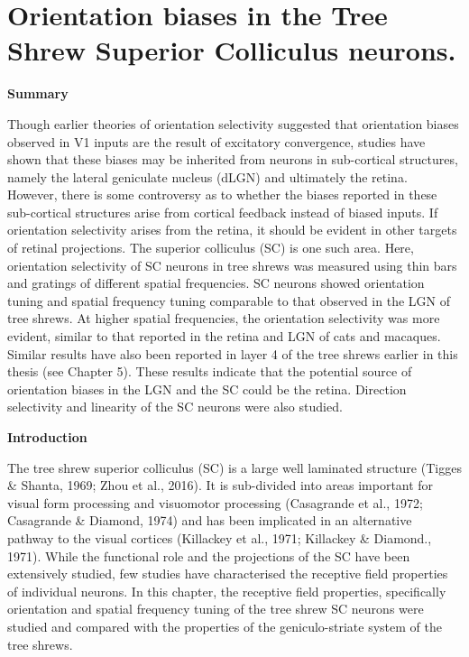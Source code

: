 \chapter{Orientation biases in the Tree Shrew Superior Colliculus
neurons.}

\textbf{Summary}

Though earlier theories of orientation selectivity suggested that
orientation biases observed in V1 inputs are the result of excitatory
convergence, studies have shown that these biases may be inherited from
neurons in sub-cortical structures, namely the lateral geniculate
nucleus (dLGN) and ultimately the retina. However, there is some
controversy as to whether the biases reported in these sub-cortical
structures arise from cortical feedback instead of biased inputs. If
orientation selectivity arises from the retina, it should be evident in
other targets of retinal projections. The superior colliculus (SC) is
one such area. Here, orientation selectivity of SC neurons in tree
shrews was measured using thin bars and gratings of different spatial
frequencies. SC neurons showed orientation tuning and spatial frequency
tuning comparable to that observed in the LGN of tree shrews. At higher
spatial frequencies, the orientation selectivity was more evident,
similar to that reported in the retina and LGN of cats and macaques.
Similar results have also been reported in layer 4 of the tree shrews
earlier in this thesis (see Chapter 5). These results indicate that the
potential source of orientation biases in the LGN and the SC could be
the retina. Direction selectivity and linearity of the SC neurons were
also studied.

\textbf{Introduction}

The tree shrew superior colliculus (SC) is a large well laminated
structure (Tigges \& Shanta, 1969; Zhou et al., 2016). It is sub-divided
into areas important for visual form processing and visuomotor
processing (Casagrande et al., 1972; Casagrande \& Diamond, 1974) and
has been implicated in an alternative pathway to the visual cortices
(Killackey et al., 1971; Killackey \& Diamond., 1971). While the
functional role and the projections of the SC have been extensively
studied, few studies have characterised the receptive field properties
of individual neurons. In this chapter, the receptive field properties,
specifically orientation and spatial frequency tuning of the tree shrew
SC neurons were studied and compared with the properties of the
geniculo-striate system of the tree shrews.

